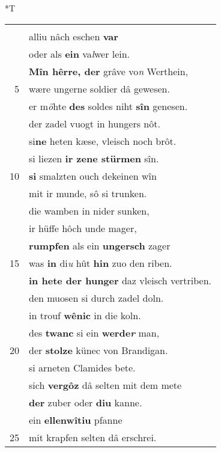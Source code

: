 \documentclass[8pt,a4paper,notitlepage]{article}
\begin{document}
\begin{table}[ht]
\begin{minipage}[t]{0.5\linewidth}
\end{minipage}
\hspace{0.5cm}
\begin{minipage}[t]{0.5\linewidth}
\small
\begin{center}*T
\end{center}
\begin{tabular}{rl}
 & \textbf{\begin{large}D\end{large}\textit{â}} was diu jâmerlîchiu schar\\ 
 & alliu nâch eschen \textbf{var}\\ 
 & oder als \textbf{ein} va\textit{l}wer lein.\\ 
 & \textbf{Mîn hêrre, der} grâve vo\textit{n} Werthein,\\ 
5 & wære ungerne soldier dâ gewesen.\\ 
 & er m\textit{ö}hte \textbf{des} soldes niht \textbf{sîn} genesen.\\ 
 & der zadel vuogt in hungers nôt.\\ 
 & si\textbf{ne} heten kæse, vleisch noch brôt.\\ 
 & si liezen \textbf{ir zene stürmen} sîn.\\ 
10 & \textbf{si} smalzten ouch dekeinen wîn\\ 
 & mit ir munde, sô si trunken.\\ 
 & die wamben in nider sunken,\\ 
 & ir hüffe hôch unde mager,\\ 
 & \textbf{rumpfen} als ein \textbf{ungersch} zager\\ 
15 & was \textbf{in} di\textit{u} hût \textbf{hin} zuo den riben.\\ 
 & \textbf{in hete der hunger} daz vleisch vertriben.\\ 
 & den muosen si durch zadel doln.\\ 
 & in trouf \textbf{wênic} in die koln.\\ 
 & des \textbf{twanc} si ein \textbf{werde\textit{r}} man,\\ 
20 & der \textbf{stolze} künec von Brandigan.\\ 
 & si arneten Clamides bete.\\ 
 & sich \textbf{vergôz} dâ selten mit dem mete\\ 
 & \textbf{der} zuber oder \textbf{diu} kanne.\\ 
 & ein \textbf{ellenwîtiu} pfanne\\ 
25 & mit krapfen selten dâ erschrei.\\ 

\end{tabular}
\end{minipage}
\end{table}
\end{document}
